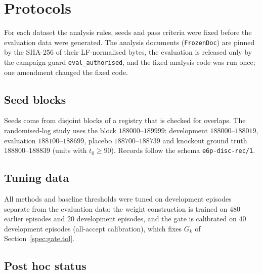 \section{Protocols}
\label{spec:pro}

For each dataset the analysis rules, seeds and pass criteria were fixed before the evaluation data were generated. The analysis documents (\texttt{FrozenDoc}) are pinned by the SHA-256 of their LF-normalised bytes, the evaluation is released only by the campaign guard \texttt{eval\_authorised}, and the fixed analysis code was run once; one amendment changed the fixed code.


\subsection{Seed blocks}
\label{spec:pro.seeds}

Seeds come from disjoint blocks of a registry that is checked for overlaps. The randomised-log study uses the block $188000$--$189999$: development $188000$--$188019$, evaluation $188100$--$188699$, placebo $188700$--$188739$ and knockout ground truth $188800$--$188839$ (units with $t_0 \ge 90$). Records follow the schema \texttt{e6p-disc-rec/1}.


\subsection{Tuning data}
\label{spec:pro.tune}

All methods and baseline thresholds were tuned on development episodes separate from the evaluation data; the weight construction is trained on $480$ earlier episodes and $20$ development episodes, and the gate is calibrated on $40$ development episodes (all-accept calibration), which fixes $G_k$ of Section~\ref{spec:gate.tol}.


\subsection{Post hoc status}
\label{spec:pro.status}


